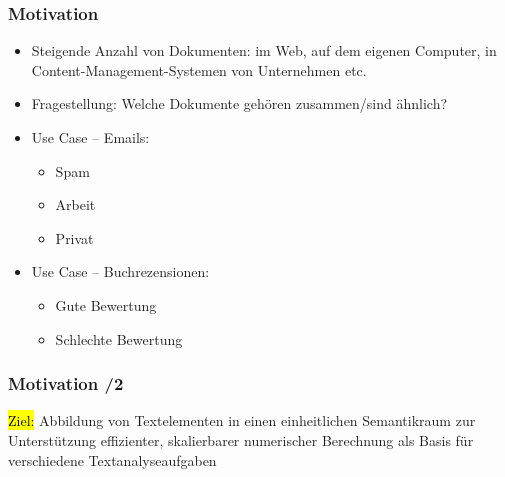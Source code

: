 \begin{frame}
    \frametitle{Motivation}

    \begin{itemize}
    \item Steigende Anzahl von Dokumenten: im Web, auf dem eigenen Computer, in Content-Management-Systemen von Unternehmen etc.
    \item Fragestellung: Welche Dokumente gehören zusammen/sind ähnlich?
    \item Use Case -- Emails:
    \begin{itemize}
    \item Spam
    \item Arbeit
    \item Privat
    \end{itemize}
    \item Use Case -- Buchrezensionen:
    \begin{itemize}
    \item Gute Bewertung
    \item Schlechte Bewertung
    \end{itemize}
    \end{itemize}
\end{frame}


\begin{frame}
    \frametitle{Motivation /2}

\hl{Ziel:} Abbildung von Textelementen in einen einheitlichen Semantikraum zur Unterstützung effizienter, skalierbarer numerischer Berechnung
als Basis für verschiedene Textanalyseaufgaben

\end{frame}

    
